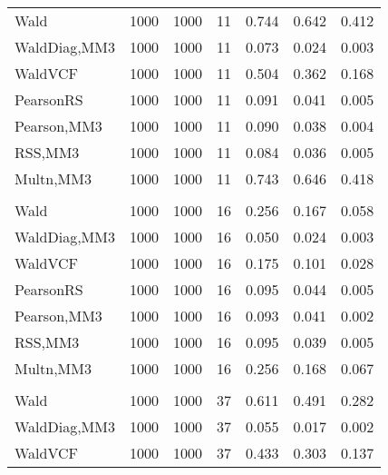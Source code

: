 \documentclass[
]{article}
\begin{document}
\begin{table}[H]
{\begin{tabular}[t]{lrrrrrr}
\hspace{1em}Wald & 1000 & 1000 & 11 & 0.744 & 0.642 & 0.412\\
\hspace{1em}WaldDiag,MM3 & 1000 & 1000 & 11 & 0.073 & 0.024 & 0.003\\
\hspace{1em}WaldVCF & 1000 & 1000 & 11 & 0.504 & 0.362 & 0.168\\
\hspace{1em}PearsonRS & 1000 & 1000 & 11 & 0.091 & 0.041 & 0.005\\
\hspace{1em}Pearson,MM3 & 1000 & 1000 & 11 & 0.090 & 0.038 & 0.004\\
\hspace{1em}RSS,MM3 & 1000 & 1000 & 11 & 0.084 & 0.036 & 0.005\\
\hspace{1em}Multn,MM3 & 1000 & 1000 & 11 & 0.743 & 0.646 & 0.418\\
\addlinespace[0.3em]
\multicolumn{7}{l}{\textbf{2F 10V}}\\
\hspace{1em}Wald & 1000 & 1000 & 16 & 0.256 & 0.167 & 0.058\\
\hspace{1em}WaldDiag,MM3 & 1000 & 1000 & 16 & 0.050 & 0.024 & 0.003\\
\hspace{1em}WaldVCF & 1000 & 1000 & 16 & 0.175 & 0.101 & 0.028\\
\hspace{1em}PearsonRS & 1000 & 1000 & 16 & 0.095 & 0.044 & 0.005\\
\hspace{1em}Pearson,MM3 & 1000 & 1000 & 16 & 0.093 & 0.041 & 0.002\\
\hspace{1em}RSS,MM3 & 1000 & 1000 & 16 & 0.095 & 0.039 & 0.005\\
\hspace{1em}Multn,MM3 & 1000 & 1000 & 16 & 0.256 & 0.168 & 0.067\\
\addlinespace[0.3em]
\multicolumn{7}{l}{\textbf{3F 15V}}\\
\hspace{1em}Wald & 1000 & 1000 & 37 & 0.611 & 0.491 & 0.282\\
\hspace{1em}WaldDiag,MM3 & 1000 & 1000 & 37 & 0.055 & 0.017 & 0.002\\
\hspace{1em}WaldVCF & 1000 & 1000 & 37 & 0.433 & 0.303 & 0.137\\

\end{tabular}}
\end{table}
\end{document}
